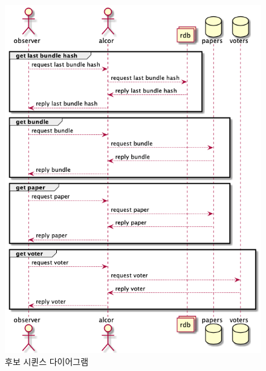 \documentclass[10pt,a4paper,left=15mm,right=15mm,top=20mm,bottom=20mm]{article}
\begin{document}
    \begin{figure}[h]
        \begin{center}
            \includegraphics[width=13cm]{observer-get.png}
            \caption{후보 시퀸스 다이어그램}
        \end{center}
    \end{figure}
\end{document}
